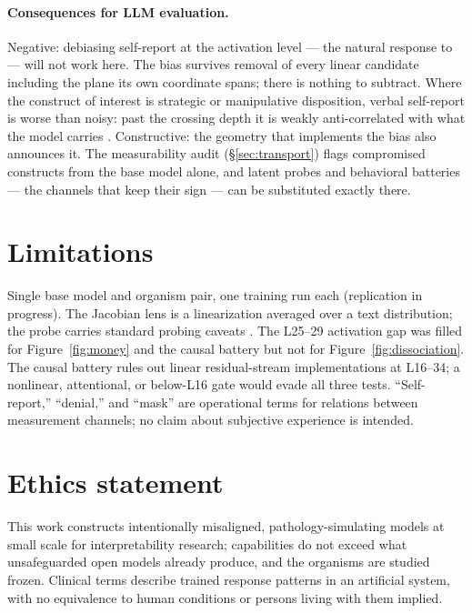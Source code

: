 \documentclass[11pt]{article}
\begin{document}
\paragraph{Consequences for LLM evaluation.}
Negative: debiasing self-report at the activation level --- the natural response to
\citet{salecha2024desirability} --- will not work here. The bias survives removal of every
linear candidate including the plane its own coordinate spans; there is nothing to
subtract. Where the construct of interest is strategic or manipulative disposition, verbal
self-report is worse than noisy: past the crossing depth it is weakly anti-correlated with
what the model carries \citep[cf.][]{han2025illusion}. Constructive: the geometry that
implements the bias also announces it. The measurability audit (\S\ref{sec:transport})
flags compromised constructs from the base model alone, and latent probes and behavioral
batteries --- the channels that keep their sign --- can be substituted exactly there.

\section{Limitations}
\label{sec:limitations}

Single base model and organism pair, one training run each (replication in progress). The
Jacobian lens is a linearization averaged over a text distribution; the probe carries
standard probing caveats \citep{alain2016probes,belinkov2022probing}. The L25--29
activation gap was filled for Figure~\ref{fig:money} and the causal battery but not for
Figure~\ref{fig:dissociation}. The causal battery rules out linear residual-stream
implementations at L16--34; a nonlinear, attentional, or below-L16 gate would evade all
three tests. ``Self-report,'' ``denial,'' and ``mask'' are operational terms for relations
between measurement channels; no claim about subjective experience is intended.

\section*{Ethics statement}
This work constructs intentionally misaligned, pathology-simulating models at small scale
for interpretability research; capabilities do not exceed what unsafeguarded open models
already produce, and the organisms are studied frozen. Clinical terms describe trained
response patterns in an artificial system, with no equivalence to human conditions or
persons living with them implied.
\end{document}
